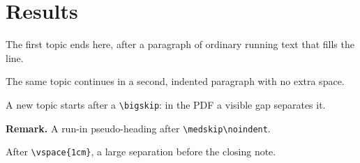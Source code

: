 \documentclass{article}
\begin{document}
\section{Results}
The first topic ends here, after a paragraph of ordinary running text that fills the line.

The same topic continues in a second, indented paragraph with no extra space.

\bigskip
A new topic starts after a \verb|\bigskip|: in the PDF a visible gap separates it.

\medskip\noindent\textbf{Remark.} A run-in pseudo-heading after \verb|\medskip\noindent|.

\vspace{1cm}
After \verb|\vspace{1cm}|, a large separation before the closing note.
\end{document}
